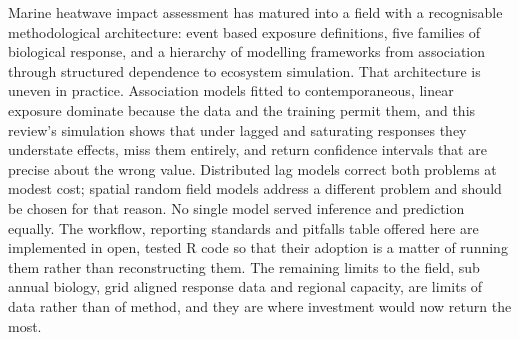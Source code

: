 Marine heatwave impact assessment has matured into a field with a recognisable methodological architecture: event based exposure definitions, five families of biological response, and a hierarchy of modelling frameworks from association through structured dependence to ecosystem simulation. That architecture is uneven in practice. Association models fitted to contemporaneous, linear exposure dominate because the data and the training permit them, and this review's simulation shows that under lagged and saturating responses they understate effects, miss them entirely, and return confidence intervals that are precise about the wrong value. Distributed lag models correct both problems at modest cost; spatial random field models address a different problem and should be chosen for that reason. No single model served inference and prediction equally. The workflow, reporting standards and pitfalls table offered here are implemented in open, tested R code so that their adoption is a matter of running them rather than reconstructing them. The remaining limits to the field, sub annual biology, grid aligned response data and regional capacity, are limits of data rather than of method, and they are where investment would now return the most.
